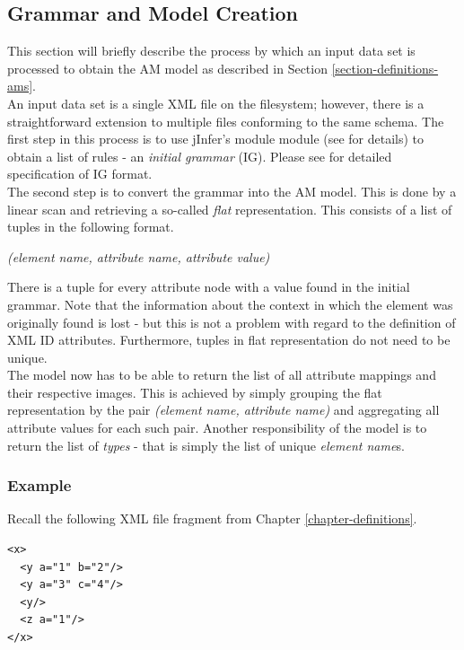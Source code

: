 \subsection{Grammar and Model Creation}

This section will briefly describe the process by which an input data set is processed to obtain the AM model as described in Section \ref{section-definitions-ams}.\\

An input data set is a single XML file on the filesystem; however, there is a straightforward extension to multiple files conforming to the same schema. The first step in this process is to use jInfer's module  module (see \cite{basiciggdoc} for details) to obtain a list of rules - an \textit{initial grammar} (IG). 
Please see \cite{archdoc} for detailed specification of IG format.\\

The second step is to convert the grammar into the AM model. This is done by a linear scan and retrieving a so-called \textit{flat} representation. This consists of a list of tuples in the following format.

\begin{center}
\textit{(element name, attribute name, attribute value)}
\end{center}

There is a tuple for every attribute node with a value found in the initial grammar. Note that the information about the context in which the element was originally found is lost - but this is not a problem with regard to the definition of XML ID attributes. Furthermore, tuples in flat representation do not need to be unique.\\

The model now has to be able to return the list of all attribute mappings and their respective images. This is achieved by simply grouping the flat representation by the pair \textit{(element name, attribute name)} and aggregating all attribute values for each such pair. Another responsibility of the model is to return the list of \textit{types} - that is simply the list of unique \textit{element name}s.

\subsubsection{Example}

Recall the following XML file fragment from Chapter \ref{chapter-definitions}.
\begin{verbatim}
<x>
  <y a="1" b="2"/>
  <y a="3" c="4"/>
  <y/>
  <z a="1"/>
</x>
\end{verbatim}

